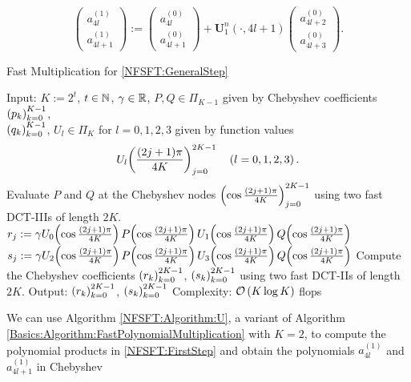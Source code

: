 \begin{equation}
\label{NFSFT:FirstStep}
  \left(\begin{array}{c}
    a_{4l}^{(1)}\\
    a_{4l+1}^{(1)} 
  \end{array}\right)
  :=
  \left(\begin{array}{c}
    a_{4l}^{(0)}\\
    a_{4l+1}^{(0)} 
  \end{array}\right)
  + {\mathbf{U}_{1}^{n}\left(\cdot,4l+1\right)}
  \left(\begin{array}{c}
    a_{4l+2}^{(0)}\\
    a_{4l+3}^{(0)} 
  \end{array}\right).
\end{equation}
\begin{algorithm}[tb]
  \caption{Fast Multiplication for \eqref{NFSFT:GeneralStep}}
  \label{NFSFT:Algorithm:U}
  \begin{algorithmic}
    \STATE Input:  $K := 2^t$, $t \in \mathbb{N}$, $\gamma \in \mathbb{R}$, $P,Q \in \Pi_{K-1}$ given by
       Chebyshev coefficients $\left(p_{k}\right)_{k=0}^{K-1}$,\\
    \STATE {} $\left(q_{k}\right)_{k=0}^{K-1}$, $U_{l} \in \Pi_{K}$ for $l=0,1,2,3$ 
      given by function values
      \[U_{l}{\hspace{-0.4ex}}\left(\frac{(2j+1)\pi}{4K}\right)_{j = 0}^{2K-1} \quad \left(l=0,1,2,3\right).\] 
    \STATE Evaluate $P$ and $Q$ at the Chebyshev nodes $\left(\cos \frac{(2j+1)\pi}{4K}\right)_{j = 0}^{2K-1}$
      using two fast DCT-IIIs of length $2K$.
    \STATE 
      \STATE $r_{j} := \gamma U_{0}{\hspace{-0.4ex}}\left(\cos \frac{(2j+1)\pi}{4K}\right) P{\hspace{-0.4ex}}\left(\cos \frac{(2j+1)\pi}{4K}\right)
        U_{1}{\hspace{-0.4ex}}\left(\cos \frac{(2j+1)\pi}{4K}\right) Q{\hspace{-0.4ex}}\left(\cos \frac{(2j+1)\pi}{4K}\right)$
      \STATE $s_{j} := \gamma U_{2}{\hspace{-0.4ex}}\left(\cos \frac{(2j+1)\pi}{4K}\right) P{\hspace{-0.4ex}}\left(\cos \frac{(2j+1)\pi}{4K}\right)
        U_{3}{\hspace{-0.4ex}}\left(\cos \frac{(2j+1)\pi}{4K}\right) Q{\hspace{-0.4ex}}\left(\cos \frac{(2j+1)\pi}{4K}\right)$
    \ENDFOR
    \STATE
    \STATE Compute the Chebyshev coefficients $\left(r_{k}\right)_{k=0}^{2K-1}$, $\left(s_{k}\right)_{k=0}^{2K-1}$ 
      using two fast DCT-IIs of length $2K$.
    \STATE
    \STATE Output: $\left(r_{k}\right)_{k=0}^{2K-1}$, $\left(s_{k}\right)_{k=0}^{2K-1}$
    \STATE Complexity: $\mathcal{O}\left(K \log K\right)$ flops
  \end{algorithmic}
\end{algorithm}  
We can use Algorithm \ref{NFSFT:Algorithm:U}, a variant of Algorithm 
\ref{Basics:Algorithm:FastPolynomialMultiplication} with $K=2$, to compute the polynomial products in 
\eqref{NFSFT:FirstStep} and obtain the polynomials $a_{4l}^{(1)}$ and $a_{4l+1}^{(1)}$ in Chebyshev 

